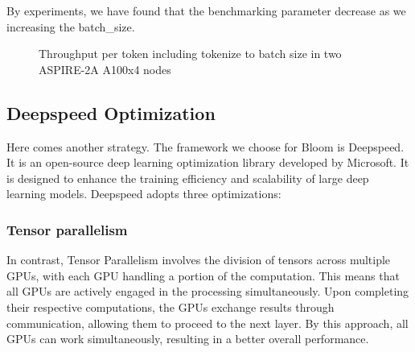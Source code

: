 By experiments, we have found that the benchmarking parameter decrease as we increasing the batch\_size.

\begin{figure}
\centering
{}
\caption{Throughput per token including tokenize to batch size in two ASPIRE-2A A100x4 nodes}
\end{figure}


\subsection{Deepspeed Optimization}
Here comes another strategy. The framework we choose for Bloom is Deepspeed. It is an open-source deep learning optimization library developed by Microsoft. It is designed to enhance the training efficiency and scalability of large deep learning models. 
Deepspeed adopts three optimizations:
\subsubsection{Tensor parallelism}
In contrast, Tensor Parallelism involves the division of tensors across multiple GPUs, with each GPU handling a portion of the computation. This means that all GPUs are actively engaged in the processing simultaneously. Upon completing their respective computations, the GPUs exchange results through communication, allowing them to proceed to the next layer. By this approach, all GPUs can work simultaneously, resulting in a better overall performance.


